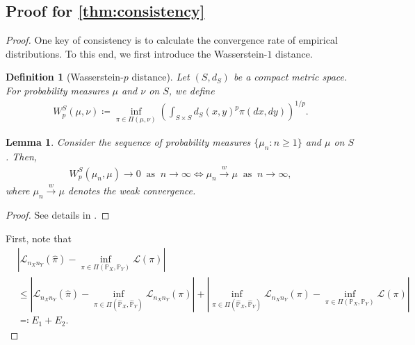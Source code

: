 \documentclass{article}
\newtheorem{lemma}{Lemma}
\newtheorem{definition}{Definition}
\begin{document}
\subsection{Proof for \cref{thm:consistency}}\label{pf:thm:consistency}
\begin{proof}
	One key of consistency is to calculate the convergence rate of empirical distributions. To this end, we first introduce the Wasserstein-$1$ distance.
	\begin{definition}[Wasserstein-$p$ distance]
		\label{def:Wasserstein-p}
		Let $(S,d_S)$ be a compact metric space. For probability measures $\mu$ and $\nu$ on $S$, we define
		\begin{align*}
			W_p^S(\mu,\nu) \coloneqq \inf_{\pi \in \Pi(\mu,\nu)} \left(\int_{S \times S} d_S(x,y)^p \pi(dx,dy)\right)^{1/p} . 
		\end{align*}
	\end{definition}
	
	\begin{lemma}
		\label{lem:equivalence-to-weak-convergence}
		Consider the sequence of probability measures $\{\mu_n: n \geq 1\}$ and $\mu$ on $S$. Then,
		\begin{align*}
			W_p^S(\mu_n,\mu) \to 0 \;\; \text{as} \;\; n \to \infty \iff \mu_n \overset{w}{\to} \mu \;\; \text{as} \;\; n \to \infty ,
		\end{align*}
		where $\mu_n \overset{w}{\to} \mu$ denotes the weak convergence.
	\end{lemma}
	\begin{proof}
		See details in \cite{villani2008optimal}.
	\end{proof}
	
	First, note that
	\begin{align*}
		&\left\vert \mathcal{L}_{n_Xn_Y}(\hat{\pi}) - \inf_{\pi \in \Pi(\mathbb{P}_X,\mathbb{P}_Y)} \mathcal{L}(\pi) \right\vert \\
		&\leq \left\vert \mathcal{L}_{n_Xn_Y}(\hat{\pi}) - \inf_{\pi \in \Pi(\hat{\mathbb{P}}_X,\hat{\mathbb{P}}_Y)} \mathcal{L}_{n_Xn_Y}(\pi) \right\vert + \left\vert \inf_{\pi \in \Pi(\hat{\mathbb{P}}_X,\hat{\mathbb{P}}_Y)} \mathcal{L}_{n_Xn_Y}(\pi) - \inf_{\pi \in \Pi(\mathbb{P}_X,\mathbb{P}_Y)} \mathcal{L}(\pi) \right\vert \\
		&\eqqcolon E_1 + E_2 .
	\end{align*}
	

\end{proof}
\end{document}
